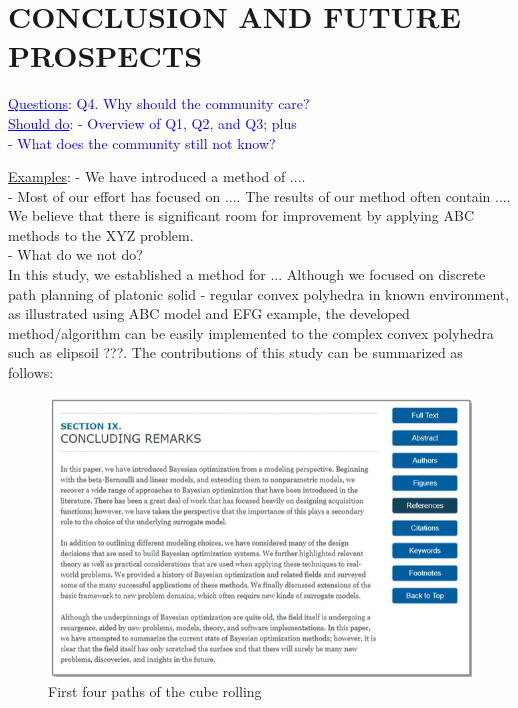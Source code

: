 
\section{CONCLUSION AND FUTURE PROSPECTS}
\textcolor{blue}{
\uline{Questions}: Q4. Why should the community care?\\
\noindent\uline{Should do}: 
- Overview of Q1, Q2, and Q3; plus\\
- What does the community still not know?\\
}

\noindent\uline{Examples}:
- We have introduced a method of ....\\
- Most of our effort has focused on .... The results of our method often contain .... We believe that there is significant room for improvement by applying ABC methods to the XYZ problem.\\
- What do we not do?\\

In this study, we established a method for ... Although we focused on discrete path planning of platonic solid - regular convex polyhedra in known environment, as illustrated using ABC model and EFG example, the developed method/algorithm can be easily implemented to the complex convex polyhedra such as elipsoil ???. The contributions of this study can be summarized as follows:\\

\begin{figure}[h]
\centering
	\includegraphics[width=1\textwidth]{image/IEEEDisCon}
	\caption{First four paths of the cube rolling}
	\label{fig:Tetra2Case1}
\end{figure}